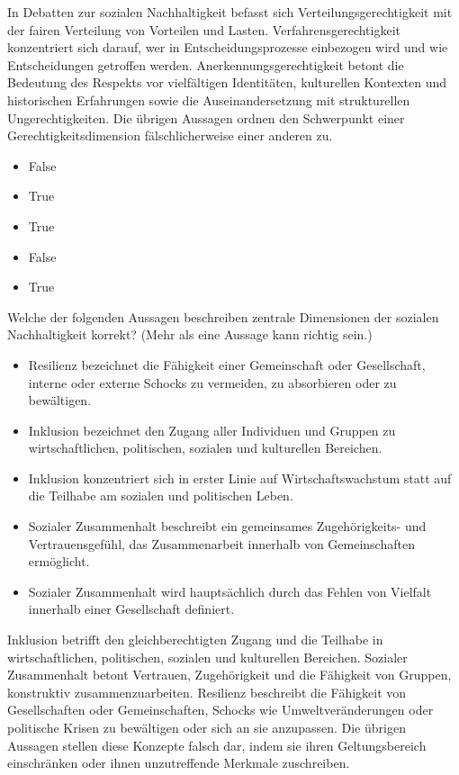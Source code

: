 \documentclass[
  nswissgerman,
  a4paper,
  DIV=11,
  numbers=noendperiod,
  oneside,
  openany]{scrreprt}
\providecommand{\tightlist}{%
  \setlength{\itemsep}{0pt}\setlength{\parskip}{0pt}}
\begin{document}
In Debatten zur sozialen Nachhaltigkeit befasst sich
Verteilungsgerechtigkeit mit der fairen Verteilung von Vorteilen und
Lasten. Verfahrensgerechtigkeit konzentriert sich darauf, wer in
Entscheidungsprozesse einbezogen wird und wie Entscheidungen getroffen
werden. Anerkennungsgerechtigkeit betont die Bedeutung des Respekts vor
vielfältigen Identitäten, kulturellen Kontexten und historischen
Erfahrungen sowie die Auseinandersetzung mit strukturellen
Ungerechtigkeiten. Die übrigen Aussagen ordnen den Schwerpunkt einer
Gerechtigkeitsdimension fälschlicherweise einer anderen zu.

\begin{itemize}
\tightlist
\item
  False
\item
  True
\item
  True
\item
  False
\item
  True
\end{itemize}

Welche der folgenden Aussagen beschreiben zentrale Dimensionen der
sozialen Nachhaltigkeit korrekt? (Mehr als eine Aussage kann richtig
sein.)

\begin{itemize}
\tightlist
\item[$\square$]
  Resilienz bezeichnet die Fähigkeit einer Gemeinschaft oder
  Gesellschaft, interne oder externe Schocks zu vermeiden, zu
  absorbieren oder zu bewältigen.
\item[$\square$]
  Inklusion bezeichnet den Zugang aller Individuen und Gruppen zu
  wirtschaftlichen, politischen, sozialen und kulturellen Bereichen.
\item[$\square$]
  Inklusion konzentriert sich in erster Linie auf Wirtschaftswachstum
  statt auf die Teilhabe am sozialen und politischen Leben.
\item[$\square$]
  Sozialer Zusammenhalt beschreibt ein gemeinsames Zugehörigkeits- und
  Vertrauensgefühl, das Zusammenarbeit innerhalb von Gemeinschaften
  ermöglicht.
\item[$\square$]
  Sozialer Zusammenhalt wird hauptsächlich durch das Fehlen von Vielfalt
  innerhalb einer Gesellschaft definiert.
\end{itemize}

Inklusion betrifft den gleichberechtigten Zugang und die Teilhabe in
wirtschaftlichen, politischen, sozialen und kulturellen Bereichen.
Sozialer Zusammenhalt betont Vertrauen, Zugehörigkeit und die Fähigkeit
von Gruppen, konstruktiv zusammenzuarbeiten. Resilienz beschreibt die
Fähigkeit von Gesellschaften oder Gemeinschaften, Schocks wie
Umweltveränderungen oder politische Krisen zu bewältigen oder sich an
sie anzupassen. Die übrigen Aussagen stellen diese Konzepte falsch dar,
indem sie ihren Geltungsbereich einschränken oder ihnen unzutreffende
Merkmale zuschreiben.
\end{document}
